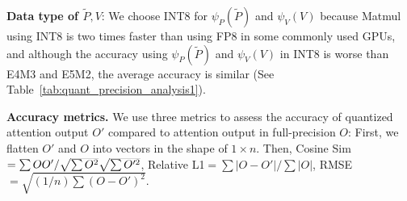 \textbf{Data type of $\widetilde P, V$}: We choose INT8 for $\psi_P(\widetilde P)$ and $\psi_V(V)$ because Matmul using INT8 is two times faster than using FP8 in some commonly used GPUs, and although the accuracy using $\psi_P(\widetilde P)$ and $\psi_V(V)$ in INT8 is worse than E4M3 and E5M2, the average accuracy is similar (See Table~\ref{tab:quant_precision_analysis1}).

\textbf{Accuracy metrics.} We use three metrics to assess the accuracy of quantized attention output $O'$ compared to attention output in full-precision $O$: First, we flatten $O'$ and $O$ into vectors in the shape of $1\times n$. Then, Cosine Sim$=\sum OO' / \smash{\sqrt{\sum O^2}} \smash{\sqrt{\sum O'^2}}$, Relative L1$=\sum |O - O'| / \sum |O|$, RMSE$=\sqrt{(1/n) \sum (O - O')^2}$.

\begin{table}[htb!]
    \centering
    \begin{minipage}{0.46\textwidth}
        \raggedright
        \caption{\textbf{Average accuracy} using different accumulators across all layers of real models.}
        \label{tab:quant_accu_analysis1}
        \setlength\tabcolsep{5pt}
    \end{minipage}
    \hspace{0.025\textwidth} 
    \begin{minipage}{0.5\textwidth}
        \raggedleft
        \caption{\textbf{Worst accuracy} using different accumulators across all layers of real models.}
        \label{tab:quant_accu_analysis2}
        \setlength\tabcolsep{5pt}
    \end{minipage}
\end{table}

